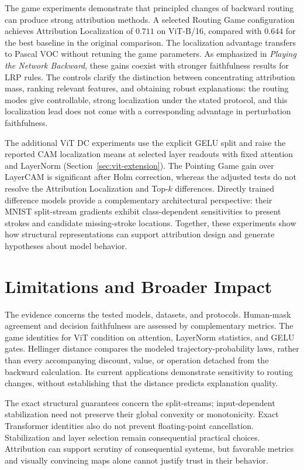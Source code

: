 The game experiments demonstrate that principled changes of backward routing can produce strong attribution methods. A selected Routing Game configuration achieves Attribution Localization of $0.711$ on ViT-B/16, compared with $0.644$ for the best baseline in the original comparison. The localization advantage transfers to Pascal VOC without retuning the game parameters. As emphasized in \emph{Playing the Network Backward}, these gains coexist with stronger faithfulness results for LRP rules. The controls clarify the distinction between concentrating attribution mass, ranking relevant features, and obtaining robust explanations: the routing modes give controllable, strong localization under the stated protocol, and this localization lead does not come with a corresponding advantage in perturbation faithfulness.

The additional ViT DC experiments use the explicit GELU split and raise the reported CAM localization means at selected layer readouts with fixed attention and LayerNorm (Section~\ref{sec:vit-extension}). The Pointing Game gain over LayerCAM is significant after Holm correction, whereas the adjusted tests do not resolve the Attribution Localization and Top-$k$ differences. Directly trained difference models provide a complementary architectural perspective: their MNIST split-stream gradients exhibit class-dependent sensitivities to present strokes and candidate missing-stroke locations. Together, these experiments show how structural representations can support attribution design and generate hypotheses about model behavior.

\section{Limitations and Broader Impact}\label{sec:limitations}\label{sec:broader_impact}\label{ptnb:app:broader-impact}

The evidence concerns the tested models, datasets, and protocols. Human-mask agreement and decision faithfulness are assessed by complementary metrics. The game identities for ViT condition on attention, LayerNorm statistics, and GELU gates. Hellinger distance compares the modeled trajectory-probability laws, rather than every accompanying discount, value, or operation detached from the backward calculation. Its current applications demonstrate sensitivity to routing changes, without establishing that the distance predicts explanation quality.

The exact structural guarantees concern the split-streams; input-dependent stabilization need not preserve their global convexity or monotonicity. Exact Transformer identities also do not prevent floating-point cancellation. Stabilization and layer selection remain consequential practical choices. Attribution can support scrutiny of consequential systems, but favorable metrics and visually convincing maps alone cannot justify trust in their behavior.

